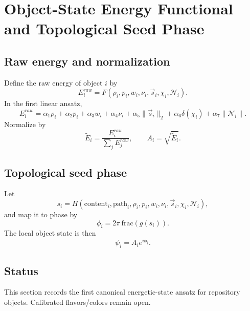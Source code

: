 \section{Object-State Energy Functional and Topological Seed Phase}
\label{sec:object-state-energy}

\subsection{Raw energy and normalization}
Define the raw energy of object $i$ by
\begin{equation}
E_i^{raw}=F(\rho_i,p_i,w_i,\nu_i,\vec s_i,\chi_i,\mathcal N_i).
\end{equation}
In the first linear ansatz,
\begin{equation}
E_i^{raw}=\alpha_1\rho_i+\alpha_2 p_i+\alpha_3 w_i+\alpha_4\nu_i+\alpha_5\|\vec s_i\|_2+\alpha_6\delta(\chi_i)+\alpha_7\|\mathcal N_i\|.
\end{equation}
Normalize by
\begin{equation}
\widetilde E_i = \frac{E_i^{raw}}{\sum_j E_j^{raw}},
\qquad
A_i = \sqrt{\widetilde E_i}.
\end{equation}

\subsection{Topological seed phase}
Let
\begin{equation}
s_i = H(\text{content}_i,\text{path}_i,\rho_i,p_i,w_i,\nu_i,\vec s_i,\chi_i,\mathcal N_i),
\end{equation}
and map it to phase by
\begin{equation}
\phi_i = 2\pi\,\mathrm{frac}(g(s_i)).
\end{equation}
The local object state is then
\begin{equation}
\psi_i=A_i e^{i\phi_i}.
\end{equation}

\subsection{Status}
This section records the first canonical energetic-state ansatz for repository objects. Calibrated flavors/colors remain open.
